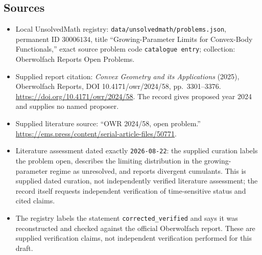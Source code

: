 \documentclass[11pt]{article}
\begin{document}
\subsection{Sources}
\begin{itemize}
\item Local UnsolvedMath registry: \texttt{data/unsolvedmath/problems.json}, permanent ID $30006134$, title ``Growing-Parameter Limits for Convex-Body Functionals,'' exact source problem code \texttt{catalogue entry}; collection: Oberwolfach Reports Open Problems.
\item Supplied report citation: \emph{Convex Geometry and its Applications} (2025), Oberwolfach Reports, DOI 10.4171/owr/2024/58, pp.~3301--3376. \url{https://doi.org/10.4171/owr/2024/58}. The record gives proposed year 2024 and supplies no named proposer.
\item Supplied literature source: ``OWR 2024/58, open problem.'' \url{https://ems.press/content/serial-article-files/50771}.
\item Literature assessment dated exactly \texttt{2026-08-22}: the supplied curation labels the problem open, describes the limiting distribution in the growing-parameter regime as unresolved, and reports divergent cumulants. This is supplied dated curation, not independently verified literature assessment; the record itself requests independent verification of time-sensitive status and cited claims.
\item The registry labels the statement \texttt{corrected\_verified} and says it was reconstructed and checked against the official Oberwolfach report. These are supplied verification claims, not independent verification performed for this draft.
\end{itemize}
\end{document}
